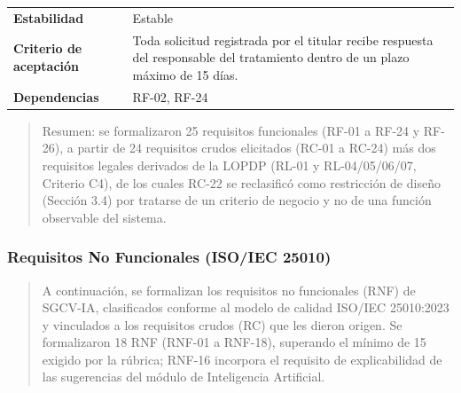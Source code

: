 \documentclass[
]{article}
\begin{document}
{\begin{longtable}[]{@{}
  >{\raggedright\arraybackslash}p{}
  >{\raggedright\arraybackslash}p{}@{}}
\textbf{Estabilidad} & \begin{minipage}[t]{\linewidth}\raggedright
Estable
\end{minipage} \\
\textbf{Criterio de aceptación} &
\begin{minipage}[t]{\linewidth}\raggedright
Toda solicitud registrada por el titular recibe respuesta del
responsable del tratamiento dentro de un plazo máximo de 15 días.
\end{minipage} \\
\textbf{Dependencias} & \begin{minipage}[t]{\linewidth}\raggedright
RF-02, RF-24
\end{minipage} \\
\end{longtable}
}

\begin{quote}
Resumen: se formalizaron 25 requisitos funcionales (RF-01 a RF-24 y
RF-26), a partir de 24 requisitos crudos elicitados (RC-01 a RC-24) más
dos requisitos legales derivados de la LOPDP (RL-01 y
RL-04/05/06/07, Criterio C4), de los cuales RC-22 se reclasificó como
restricción de diseño (Sección 3.4) por tratarse de un criterio de
negocio y no de una
función observable del sistema.
\end{quote}

\subsubsection{Requisitos No Funcionales (ISO/IEC
25010)}\label{requisitos-no-funcionales-isoiec-25010}

\begin{quote}
A continuación, se formalizan los requisitos no funcionales (RNF) de
SGCV-IA, clasificados conforme al modelo de calidad ISO/IEC 25010:2023 y
vinculados a los requisitos crudos (RC) que les dieron origen. Se
formalizaron 18 RNF (RNF-01 a RNF-18), superando el mínimo de 15
exigido por la rúbrica; RNF-16 incorpora el requisito de explicabilidad
de las sugerencias del módulo de Inteligencia Artificial.
\end{quote}
\end{document}
